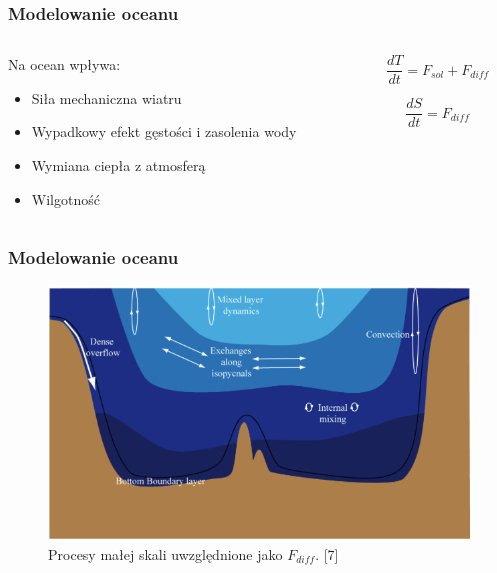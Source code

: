 \documentclass{beamer}
\begin{document}
\begin{frame}
	\frametitle{Modelowanie oceanu}
	\begin{columns}
		\begin{column}{0.5\textwidth}
			Na ocean wpływa:
			\begin{itemize}
				\item Siła mechaniczna wiatru
				\item Wypadkowy efekt gęstości i zasolenia wody
				\item Wymiana ciepła z atmosferą
				\item Wilgotność
			\end{itemize}		
			
		\end{column}
		\begin{column}{0.5\textwidth}
		\begin{block}{}
			\[\frac{dT}{dt} = F_{sol} + F_{diff}	\]
			\end{block}
			\begin{block}{}
			\[\frac{dS}{dt} = F_{diff}	\]
			\end{block}


		\end{column}
		
	\end{columns}
	
	
\end{frame}
\begin{frame}
	\frametitle{Modelowanie oceanu}
			\begin{figure}[h]
				\begin{center}
					\includegraphics[width=0.8\linewidth]{images/ocean.png}
					\caption{Procesy małej skali uwzględnione jako $F_{diff}$. [7]}
				\end{center}
			\end{figure}

	
	
\end{frame}
\end{document}
